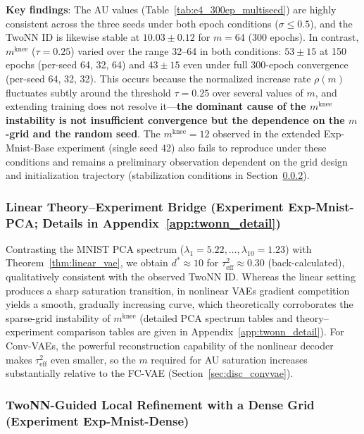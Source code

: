 \documentclass[make,article,submit,pdftex,moreauthors]{Definitions/mdpi}
\newcommand{\mknee}{m^{\mathrm{knee}}}
\begin{document}
\textbf{Key findings}:
The AU values (Table~\ref{tab:e4_300ep_multiseed}) are highly consistent across the three
seeds under both epoch conditions ($\sigma \leq 0.5$), and the TwoNN ID is likewise stable
at $10.03 \pm 0.12$ for $m = 64$ (300 epochs).
In contrast, $\mknee$ ($\tau=0.25$) varied over the range 32--64 in both conditions:
$53 \pm 15$ at 150 epochs (per-seed 64, 32, 64) and $43 \pm 15$ even under full
300-epoch convergence (per-seed 64, 32, 32).
This occurs because the normalized increase rate $\rho(m)$ fluctuates subtly around the
threshold $\tau = 0.25$ over several values of $m$, and extending training does not resolve
it---\textbf{the dominant cause of the $\mknee$ instability is not insufficient convergence
but the dependence on the $m$-grid and the random seed}.
The $\mknee = 12$ observed in the extended Exp-Mnist-Base experiment (single seed 42) also
fails to reproduce under these conditions and remains a preliminary observation dependent
on the grid design and initialization trajectory (stabilization conditions in
Section~\ref{sec:exp_el}).

\subsubsection{Linear Theory--Experiment Bridge (Experiment Exp-Mnist-PCA; Details in Appendix~\ref{app:twonn_detail})}\label{sec:exp_em}

Contrasting the MNIST PCA spectrum ($\lambda_1=5.22, \ldots, \lambda_{10}=1.23$) with
Theorem~\ref{thm:linear_vae}, we obtain $d^* \approx 10$ for
$\tau^2_\mathrm{eff} \approx 0.30$ (back-calculated), qualitatively consistent with the
observed TwoNN ID.
Whereas the linear setting produces a sharp saturation transition, in nonlinear VAEs gradient
competition yields a smooth, gradually increasing curve, which theoretically corroborates the
sparse-grid instability of $\mknee$ (detailed PCA spectrum tables and theory--experiment
comparison tables are given in Appendix~\ref{app:twonn_detail}).
For Conv-VAEs, the powerful reconstruction capability of the nonlinear decoder makes
$\tau^2_\mathrm{eff}$ even smaller, so the $m$ required for AU saturation increases
substantially relative to the FC-VAE (Section~\ref{sec:disc_convvae}).

\subsubsection{TwoNN-Guided Local Refinement with a Dense Grid (Experiment Exp-Mnist-Dense)}\label{sec:exp_el}
\end{document}
